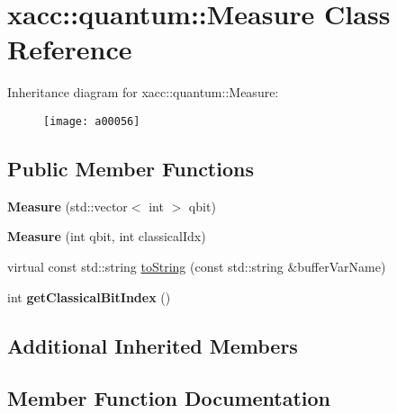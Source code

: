 \hypertarget{a00056}{}\section{xacc\+:\+:quantum\+:\+:Measure Class Reference}
\label{a00056}
Inheritance diagram for xacc\+:\+:quantum\+:\+:Measure\+:\begin{figure}[H]
\begin{center}
\leavevmode
\texttt{[image: a00056]}
\end{center}
\end{figure}
\subsection*{Public Member Functions}
\begin{DoxyCompactItemize}
\item 
{\bfseries Measure} (std\+::vector$<$ int $>$ qbit)\hypertarget{a00056_afe330a0eea029d842ff9c88a817dcc7d}{}\label{a00056_afe330a0eea029d842ff9c88a817dcc7d}

\item 
{\bfseries Measure} (int qbit, int classical\+Idx)\hypertarget{a00056_a9b8d9edca8ad2c3fb132780200f17335}{}\label{a00056_a9b8d9edca8ad2c3fb132780200f17335}

\item 
virtual const std\+::string \hyperlink{a00056_a1c51a5d68294dcb2ba1a9fbea63a730f}{to\+String} (const std\+::string \&buffer\+Var\+Name)
\item 
int {\bfseries get\+Classical\+Bit\+Index} ()\hypertarget{a00056_a0cb3c94731544042807236ade36fddd0}{}\label{a00056_a0cb3c94731544042807236ade36fddd0}

\end{DoxyCompactItemize}
\subsection*{Additional Inherited Members}


\subsection{Member Function Documentation}
